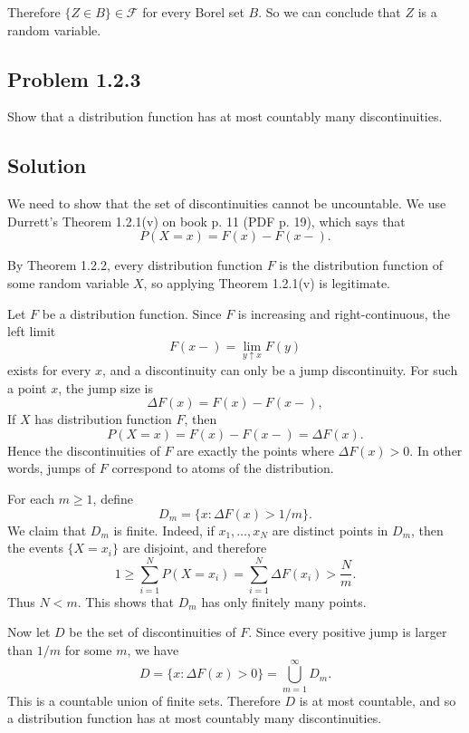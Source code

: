 \documentclass[a4paper,12pt,openany]{article}
\theoremstyle{plain}
\theoremstyle{definition}
\begin{document}
\medskip

Therefore $\{Z\in B\}\in\mathcal{F}$ for every Borel set $B$. So we can conclude that $Z$ is a random variable.

\subsection*{Problem 1.2.3}

Show that a distribution function has at most countably many discontinuities.

\subsection*{Solution}

We need to show that the set of discontinuities cannot be uncountable. We use Durrett's Theorem 1.2.1(v) on book p. 11 (PDF p. 19), which says that
\[
P(X=x)=F(x)-F(x-).
\]

By Theorem 1.2.2, every distribution function $F$ is the distribution function of some random variable $X$, so applying Theorem 1.2.1(v) is legitimate.

\medskip

Let $F$ be a distribution function. Since $F$ is increasing and right-continuous, the left limit
\[
F(x-)=\lim_{y\uparrow x}F(y)
\]
exists for every $x$, and a discontinuity can only be a jump discontinuity. For such a point $x$, the jump size is
\[
\Delta F(x)=F(x)-F(x-),
\]
If $X$ has distribution function $F$, then
\[
P(X=x)=F(x)-F(x-)=\Delta F(x).
\]
Hence the discontinuities of $F$ are exactly the points where $\Delta F(x)>0$. In other words, jumps of $F$ correspond to atoms of the distribution.

\medskip

For each $m\ge 1$, define
\[
D_m=\{x:\Delta F(x)>1/m\}.
\]
We claim that $D_m$ is finite. Indeed, if $x_1,\ldots,x_N$ are distinct points in $D_m$, then the events $\{X=x_i\}$ are disjoint, and therefore
\[
1
\ge
\sum_{i=1}^N P(X=x_i)
=
\sum_{i=1}^N \Delta F(x_i)
>
\frac{N}{m}.
\]
Thus $N<m$. This shows that $D_m$ has only finitely many points.

\medskip

Now let $D$ be the set of discontinuities of $F$. Since every positive jump is larger than $1/m$ for some $m$, we have
\[
D
=
\{x:\Delta F(x)>0\}
=
\bigcup_{m=1}^{\infty}D_m.
\]
This is a countable union of finite sets. Therefore $D$ is at most countable, and so a distribution function has at most countably many discontinuities.
\end{document}
